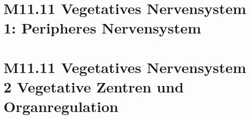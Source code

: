 \documentclass{beamer}
\begin{document}

\section{M11.11 Vegetatives Nervensystem 1: Peripheres Nervensystem }






















\section{M11.11 Vegetatives Nervensystem 2 Vegetative Zentren und Organregulation}



\end{document}
